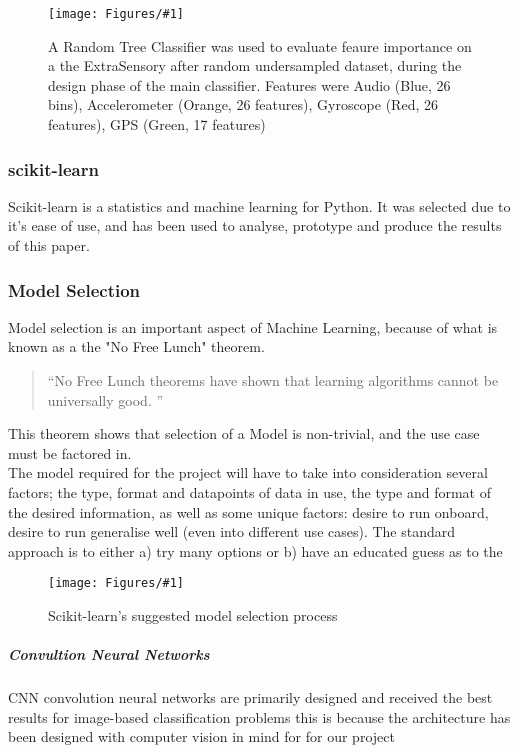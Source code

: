 \documentclass{UoNMCHA}
\newcommand{\inlineQuote}[1]{``#1''}
\newcommand{\fancyquote}[1]{\begin{quotation}\inlineQuote{#1}\end{quotation}}
\newcommand{\fFigure}[3]{
	\begin{figure}[h]
        \begin{center}  
            \texttt{[image: Figures/\#1]}  
            \caption{#2}
            \label{#1}
        \end{center}
	\end{figure}
}
\numberwithin{equation}{section}
\begin{document}
\fFigure{feature_important_just_combined_big_colour.png}{A Random Tree Classifier was used to evaluate feaure importance on a the ExtraSensory after random undersampled dataset, during the design phase of the main classifier. Features were Audio (Blue, 26 bins), Accelerometer (Orange, 26 features), Gyroscope (Red, 26 features), GPS (Green, 17 features)}{1}




\subsubsection{scikit-learn}

Scikit-learn is a statistics and machine learning for Python. It was selected due to it's ease of use, and has been used to analyse, prototype and produce the results of this paper.


\subsubsection{Model Selection}
Model selection is an important aspect of Machine Learning, because of what is known as a the "No Free Lunch" theorem. 
\fancyquote{No Free Lunch theorems have shown that learning algorithms cannot be universally good. \cite{NFL_quote}}
This theorem shows that selection of a Model is non-trivial, and the use case must be factored in.\\

The model required for the project will have to take into consideration several factors; the type, format and datapoints of data in use, the type and format of the desired information, as well as some unique factors: desire to run onboard, desire to run generalise well (even into different use cases). The standard approach is to either a) try many options or b) have an educated guess as to the 

\fFigure{modelselection.png}{Scikit-learn's suggested model selection process}{0.8}


\subparagraph{Convultion Neural Networks}
CNN convolution neural networks are primarily designed and received the best results for image-based classification problems this is because the architecture has been designed with computer vision in mind for for our project
\end{document}
